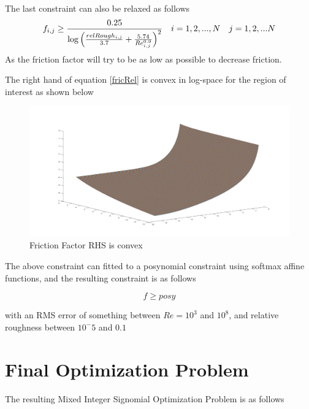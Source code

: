 \documentclass[12pt]{article}
\begin{document}
	The last constraint can also be relaxed as follows
	\begin{equation}
	f_{i,j} \geq \frac{0.25}{\log\left(\frac{relRough_{i,j}}{3.7} + \frac{5.74}{Re_{i,j}^{0.9}}\right)^2} \quad i = 1, 2, ..., N \quad j = 1, 2, ... N\\
	\label{fricRel}
	\end{equation}
	As the friction factor will try to be as low as possible to decrease friction.
	
	The right hand of equation \eqref{fricRel} is convex in log-space for the region of interest as shown below
	\begin{figure}
		\centering
		\includegraphics[scale=0.3]{frictionFactorLogSpace.png}
		\caption{Friction Factor RHS is convex}
		\label{fig:fricFactorLogSpace}
	\end{figure}
	The above constraint can fitted to a posynomial constraint using softmax affine functions, and the resulting constraint is as follows
	
	\begin{equation}
	f \geq posy
	\end{equation}
	
	with an RMS error of something between $Re = 10^3$ and $10^8$, and relative roughness between $10^-5$ and $0.1$
	
	\newpage
	
	\section{Final Optimization Problem}
	
	The resulting Mixed Integer Signomial Optimization Problem is as follows
	
\end{document}

